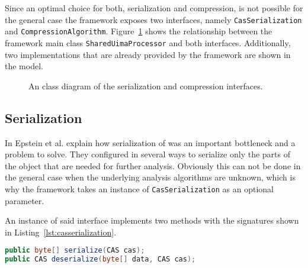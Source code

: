 Since an optimal choice for both, serialization and compression, is not possible for the general case the framework exposes two interfaces, namely \lstinline|CasSerialization| and \lstinline|CompressionAlgorithm|. Figure~\ref{fig:interfaces} shows the relationship between the framework main class \lstinline|SharedUimaProcessor| and both interfaces. Additionally, two implementations that are already provided by the framework are shown in the model.
\begin{figure}[htb]
	\centering
	\resizebox{\linewidth}{!}{\small}
	\caption[An UML class diagram of the serialization and compression interfaces.]{An \uml{} class diagram of the serialization and compression interfaces.}
	\label{fig:interfaces}
\end{figure}
\subsection{Serialization}
In \cite{epstein2012making} Epstein et al. explain how serialization of \cas{} was an important bottleneck and a problem to solve. They configured \uimaas{} in several ways to serialize only the parts of the \cas{} object that are needed for further analysis. Obviously this can not be done in the general case when the underlying analysis algorithms are unknown, which is why the framework takes an instance of \lstinline|CasSerialization| as an optional parameter.

An instance of said interface implements two methods with the signatures shown in Listing~\ref{lst:casserialization}.
\begin{lstlisting}[language=Java,caption={CasSerialization method signatures},label=lst:casserialization]
public byte[] serialize(CAS cas);
public CAS deserialize(byte[] data, CAS cas);
\end{lstlisting}

